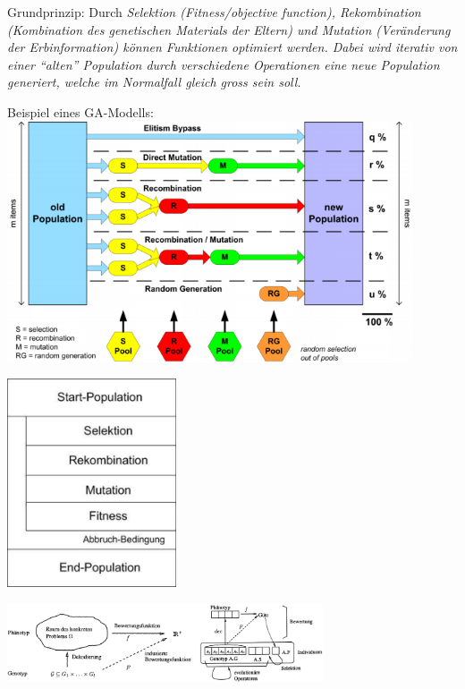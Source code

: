     Grundprinzip: Durch \em Selektion \em (Fitness/objective function), \em Rekombination \em (Kombination des genetischen Materials der Eltern) und \em Mutation \em (Veränderung der Erbinformation) können Funktionen optimiert werden. Dabei wird iterativ von einer "`alten"' Population durch verschiedene Operationen eine neue Population generiert, welche im Normalfall gleich gross sein soll.\\
    
  \begin{minipage}{12cm}  
    Beispiel eines GA-Modells:\\
    \includegraphics[width=12cm]{./Content/MetaHeuristics/GeneticAlgorithms_Model}
  \end{minipage}
  \begin{minipage}{6cm}
    \begin{flushright}
      \includegraphics[width=5cm]{./Content/MetaHeuristics/GeneticAlgorithms_Principle}
    \end{flushright}
  \end{minipage}
  
  \begin{center}
    \includegraphics[width=0.7\textwidth]{./Content/MetaHeuristics/phenoGeno}
  \end{center}
  
